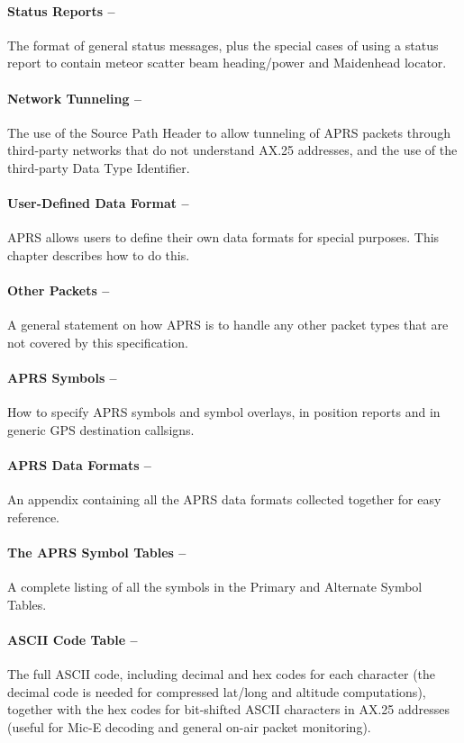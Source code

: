 \documentclass{scrreprt}[letter]
\begin{document}
\paragraph{Status Reports --}The format of general status messages, plus the special
cases of using a status report to contain meteor scatter beam heading/power
and Maidenhead locator.

\paragraph{Network Tunneling --}The use of the Source Path Header to allow
tunneling of APRS packets through third-party networks that do not
understand AX.25 addresses, and the use of the third-party Data Type
Identifier.

\paragraph{User-Defined Data Format --}APRS allows users to define their own data
formats for special purposes. This chapter describes how to do this.

\paragraph{Other Packets --} A general statement on how APRS is to handle any other
packet types that are not covered by this specification.

\paragraph{APRS Symbols --}How to specify APRS symbols and symbol overlays, in
position reports and in generic GPS destination callsigns.

\paragraph{APRS Data Formats --}An appendix containing all the APRS data formats
collected together for easy reference.

\paragraph{The APRS Symbol Tables --}A complete listing of all the symbols in the
Primary and Alternate Symbol Tables.

\paragraph{ASCII Code Table --}The full ASCII code, including decimal and hex
codes for each character (the decimal code is needed for compressed lat/long
and altitude computations), together with the hex codes for bit-shifted ASCII
characters in AX.25 addresses (useful for Mic-E decoding and general on-air
packet monitoring).
\end{document}
